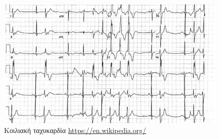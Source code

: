 \begin{figure}[h]
	\centering
	\includegraphics[scale=0.3]{ventricular tachycardia.jpg}
	\caption{Κοιλιακή ταχυκαρδία \en\protect\url{https://en.wikipedia.org/}}
\end{figure}
